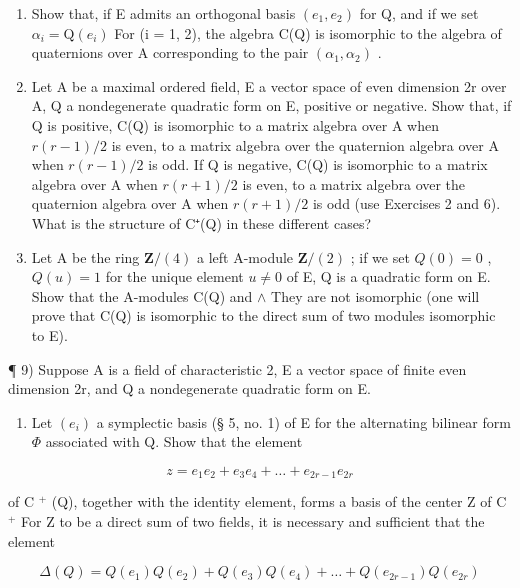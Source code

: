 \begin{enumerate}
\def\labelenumi{\arabic{enumi})}
\setcounter{enumi}{5}
\item
  Show that, if E admits an orthogonal basis \((e_{1}, e_{2})\) for Q, and if we set \(\alpha_{i} = \mathrm{Q}(e_{i})\) For (i = 1, 2), the algebra C(Q) is isomorphic to the algebra of quaternions over A corresponding to the pair \((\alpha_{1}, \alpha_{2})\) .
\item
  Let A be a maximal ordered field, E a vector space of even dimension 2r over A, Q a nondegenerate quadratic form on E, positive or negative. Show that, if Q is positive, C(Q) is isomorphic to a matrix algebra over A when \(r(r-1)/2\) is even, to a matrix algebra over the quaternion algebra over A when \(r(r-1)/2\) is odd. If Q is negative, C(Q) is isomorphic to a matrix algebra over A when \(r(r+1)/2\) is even, to a matrix algebra over the quaternion algebra over A when \(r(r+1)/2\) is odd (use Exercises 2 and 6). What is the structure of C⁺(Q) in these different cases?
\item
  Let A be the ring \(\mathbf{Z}/(4)\) a left A-module \(\mathbf{Z}/(2)\) ; if we set \(Q(0)=0\) , \(Q(u)=1\) for the unique element \(u\neq0\) of E, Q is a quadratic form on E. Show that the A-modules C(Q) and \(\wedge\) They are not isomorphic (one will prove that C(Q) is isomorphic to the direct sum of two modules isomorphic to E).
\end{enumerate}

¶ 9) Suppose A is a field of characteristic 2, E a vector space of finite even dimension 2r, and Q a nondegenerate quadratic form on E.

\begin{enumerate}
\def\labelenumi{\alph{enumi})}
\tightlist
\item
  Let \((e_i)\) a symplectic basis (§ 5, no. 1) of E for the alternating bilinear form \(\Phi\) associated with Q. Show that the element
\end{enumerate}

\[
z = e _ {1} e _ {2} + e _ {3} e _ {4} + \dots + e _ {2 r - 1} e _ {2 r}
\]

of C \(^{+}\) (Q), together with the identity element, forms a basis of the center Z of C \(^{+}\) For Z to be a direct sum of two fields, it is necessary and sufficient that the element

\[
\Delta (Q) = Q \left(e _ {1}\right) Q \left(e _ {2}\right) + Q \left(e _ {3}\right) Q \left(e _ {4}\right) + \dots + Q \left(e _ {2 r - 1}\right) Q \left(e _ {2 r}\right)
\]

